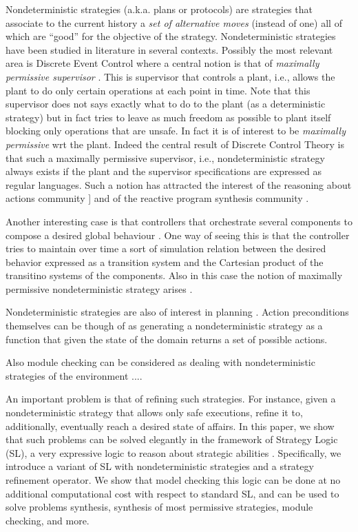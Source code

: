Nondeterministic strategies (a.k.a. plans or protocols) are strategies
that associate to the current history a \emph{set of alternative
  moves} (instead of one) all of which are ``good'' for the objective
of the strategy.
Nondeterministic strategies have been studied in literature in several
contexts.
Possibly the most relevant area is Discrete Event Control where a
central notion is that of \emph{maximally permissive supervisor}
\cite{WonhamRamadge:SIAMJCO87,Cassandras:BOOK06_DES,Wo14}. This is
supervisor that controls a plant, i.e., allows the plant to do only
certain operations at each point in time. Note that this supervisor
does not says exactly what to do to the plant (as a deterministic
strategy) but in fact tries to leave as much freedom as possible to
plant itself blocking only operations that are unsafe. In fact it is
of interest to be \emph{maximally permissive} wrt the plant. 
Indeed the central result of Discrete Control Theory is that such a
maximally permissive supervisor, i.e., nondeterministic strategy
always exists if the plant and the supervisor specifications are
expressed as regular languages. Such a notion has attracted the interest
of the reasoning about actions community
]\cite{DeGiacomoLM12,BanihashemiGL-AAMAS18} and of the reactive program
synthesis community \cite{pnueli1989synthesisshort,EhlersLTV17}.


Another interesting case is that controllers that orchestrate several components to compose a desired global behaviour \cite{DePS13,DeGiacomoVFAL18}. One way of seeing this is that the controller tries to maintain over time a sort of simulation relation between the desired behavior expressed as a transition system and the Cartesian product of the transitino systems of the components. Also in this case the notion of maximally permissive nondeterministic strategy arises \cite{DePS13}.


Nondeterministic strategies are also of interest in planning \cite{GeffnerBo13}.  Action preconditions themselves can be though of as generating a nondeterministic strategy  as a function that given the state of the domain returns a set of possible actions. 

Also module checking can be considered as dealing with nondeterministic strategies of the environment \cite{kupferman1997module,jamroga2014module} ....

An important problem is that of refining
  such strategies. For instance, given a nondeterministic strategy
  that allows only safe executions, refine it to, additionally,
  eventually reach a desired state of affairs.  In this paper, we show that such
  problems can be solved elegantly in the framework of Strategy Logic
  (SL), a very expressive logic to reason about strategic
  abilities \cite{chatterjee2010strategy,DBLP:journals/tocl/MogaveroMPV14,DBLP:conf/lics/MogaveroMS13,BMMRV17}. Specifically, we introduce a variant of SL with
  nondeterministic strategies and a strategy refinement operator. We
  show that model checking this logic can be done at no additional
  computational cost with respect to standard SL, and can be used to
  solve problems synthesis, synthesis of most permissive strategies,
  module checking, and more.

  
